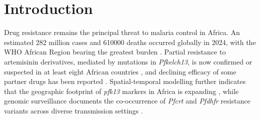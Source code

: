 \documentclass[journal=jcisd8,manuscript=article,layout=traditional]{achemso}
\begin{document}
\begin{abstract}
Using a curated collection derived from 396 African natural products and 454 synthetic antimalarials, we evaluated a multi-target docking framework across \num{136} wild-type and mutant receptor states of PfDHFR and PfCRT. On a primary candidate cohort ($n=\num{12}$), a Resistance-Resilience Score (RRS) provided a five-tier stratification decoupling predicted wild-type binding strength from mutant-state score retention. Explicit-solvent molecular dynamics (MD) simulations showed a directional divergence in \qty{87.5}{\percent} (7/8; 95\% Wilson CI \qtyrange{52.9}{97.8}{\percent}, $n=\num{8}$) of matched candidate--target states, wherein dynamic pocket relaxation retained poses where static grid docking predicted score penalties. At single-replicate scope this divergence is a protocol-local calibration signal: static docking scores and short MD trajectories provide complementary, non-equivalent triage metrics for natural product lead optimization.
\end{abstract}


\section{Introduction}

Drug resistance remains the principal threat to malaria control in Africa. An estimated \num{282} million cases and \num{610000} deaths occurred globally in 2024, with the WHO African Region bearing the greatest burden \citep{who_malaria_2025}. Partial resistance to artemisinin derivatives, mediated by mutations in \textit{Pfkelch13}, is now confirmed or suspected in at least eight African countries \citep{artemisinin_partial_resistance}, and declining efficacy of some partner drugs has been reported \citep{who_malaria_2025,global_resistance_landscape_2026}. Spatial-temporal modelling further indicates that the geographic footprint of \textit{pfk13} markers in Africa is expanding \citep{young2026artemisinin}, while genomic surveillance documents the co-occurrence of \textit{Pfcrt} and \textit{Pfdhfr} resistance variants across diverse transmission settings \citep{letebo2026surveillance,africa_resistance_2026,pfk13_resistance_2026}.
\end{document}
